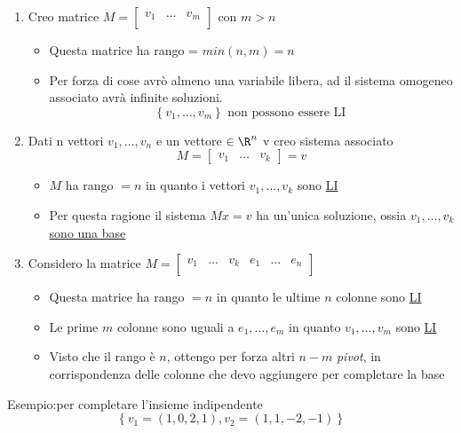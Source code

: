 \begin{enumerate}
	\item Creo matrice $M = \begin{bmatrix}
			      v_1 & \ldots & v_m \\
		      \end{bmatrix}
	      $
	      con  $m > n$
	      \begin{itemize}
		      \item Questa matrice ha rango = $min\left( n,m \right) =n$
		      \item Per forza di cose avrò almeno una variabile libera, ad il sistema omogeneo associato avrà infinite soluzioni.
		            \[
			            \left\{ v_1,\ldots,v_m \right\} \text{ non possono essere LI }
		            \]
	      \end{itemize}
	\item Dati n vettori $v_1,\ldots,v_n$ e un vettore $ \in  \R^{n}$ v creo sistema associato
	      \[
		      M=\begin{bmatrix}
			      v_1 & \ldots & v_k
		      \end{bmatrix}
		      =v
	      \]
	      \begin{itemize}
		      \item $M$ ha rango $=n$ in quanto i vettori $v_1,\ldots,v_k$ sono \underline{LI}
		      \item Per questa ragione il sistema $Mx=v$ ha un'unica soluzione, ossia \underline{ $v_1,\ldots,v_k$ sono una base}
	      \end{itemize}
	\item Considero la matrice $M= \begin{bmatrix}
			      v_1 & \ldots & v_k & e_1 & \ldots & e_n \\
		      \end{bmatrix}
	      $
	      \begin{itemize}
		      \item Questa matrice ha rango $=n$ in quanto le ultime $n$ colonne sono \underline{LI}
		      \item Le prime $m$ colonne sono uguali a $e_1,\ldots,e_m$ in quanto $v_1,\ldots,v_m$ sono  \underline{LI}
		      \item  Visto che il rango è $n$, ottengo per forza altri $n-m$ \textit{pivot}, in corrispondenza delle colonne che devo aggiungere per completare la base
	      \end{itemize}
\end{enumerate}
Esempio:per completare l'insieme indipendente
$$
	\left\{v_1=(1,0,2,1), v_2=(1,1,-2,-1)\right\}
$$
